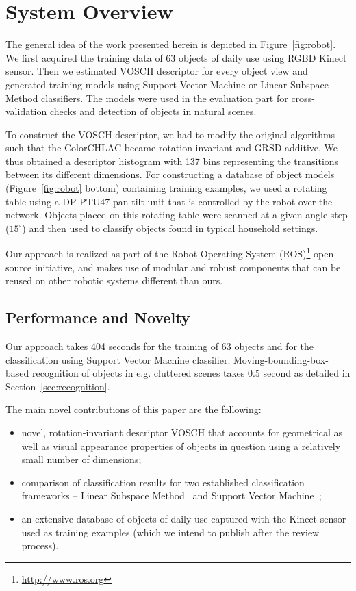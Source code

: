 \documentclass[conference]{sty/IEEEtran}
\begin{document}
\section{System Overview}
\label{sec:overview}
The general idea of the work presented herein is depicted in 
Figure~\ref{fig:robot}. We first acquired the training data of 63 objects
of daily use using RGBD Kinect sensor. Then we estimated VOSCH descriptor 
for every object view and generated training models using Support Vector
Machine or Linear Subspace Method classifiers. The models were used
in the evaluation part for cross-validation checks and detection of 
objects in natural scenes.

To construct the VOSCH descriptor, we had to modify the original algorithms
such that the ColorCHLAC became rotation invariant and GRSD 
additive. We thus obtained a descriptor histogram with 
137 bins representing the transitions between its different dimensions.
For constructing a database of object models (Figure~\ref{fig:robot} bottom)
containing training examples, we used a rotating
table using a DP PTU47 pan-tilt unit that is controlled by the robot over the
network. Objects placed on this rotating table were scanned at a given
angle-step ($15^\circ$) and then used to classify objects found in
typical household settings.

Our approach is realized as part of the Robot Operating System
(ROS)\footnote{\url{http://www.ros.org}} open source initiative, and makes
use of modular and robust components that can be reused on other robotic
systems different than ours.

\subsection{Performance and Novelty}
Our approach takes 404 seconds for the training of 63 objects 
and 
for the classification using Support Vector Machine classifier. Moving-bounding-box-based
recognition of objects in e.g. cluttered scenes takes 0.5 second as detailed
in Section~\ref{sec:recognition}.

The main novel contributions of this paper are the following:
\begin{itemize}
\item novel, rotation-invariant descriptor VOSCH that accounts for
geometrical as well as visual appearance  properties of objects in question
using a relatively small number of dimensions;
\item comparison of classification results for two established classification
frameworks -- Linear Subspace Method~\cite{watanabe1973} and Support Vector Machine~\cite{svm99};
\item an extensive database of objects of daily use captured with the Kinect sensor
used as training examples (which we intend to publish after the review process).
\end{itemize}
\end{document}
